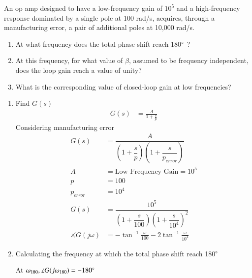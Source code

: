 An op amp designed to have a low-frequency gain of $10^{5}$ and a high-frequency response dominated by a single pole at 100 rad/s, acquires, through a manufacturing error, a pair of additional poles at 10,000 rad/s. 
\begin{enumerate}
\item At what frequency does the total phase shift reach 180$\degree$ ? 
\item At this frequency, for what value of $\beta$, assumed to be frequency independent, does the loop gain reach a value of unity? 
\item What is the corresponding value of closed-loop gain at low frequencies?
\end{enumerate}
\begin{enumerate}[label=\arabic*.,ref=\theenumi]
\item Find $G(s)$
\solution
\begin{align}
G(s) &= \frac{A}{1+\frac{s}{p}} 
\end{align}
Considering manufacturing error
\begin{align}
G(s) &= \dfrac{A}{(1+\dfrac{s}{p})(1+\dfrac{s}{p_{error}})} 
\\
A &= \text{Low Frequency Gain} = 10^{5}
\\
p &= 100
\\
p_{error} &= 10^{4}
\\
G(s) &= \dfrac{10^{5}}{(1+\dfrac{s}{100})(1+\dfrac{s}{10^{4}})^{2}}
\\
\measuredangle G(j\omega) &= -\tan^{-1}\frac{\omega}{100} - 2\tan^{-1}\frac{\omega}{10^{4}}
\end{align}
\item Calculating the frequency at which the total phase shift reach 180$\degree$ 

At $\omega_{180}, \measuredangle G(j\omega_{180}) = -180\degree$


\end{enumerate}

